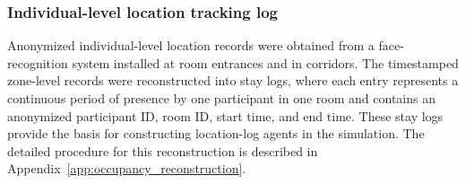 %     



\subsubsection{Individual-level location tracking log}
Anonymized individual-level location records were obtained from a face-recognition system installed at room entrances and in corridors.
The timestamped zone-level records were reconstructed into stay logs, where each entry represents a continuous period of presence by one participant in one room and contains an anonymized participant ID, room ID, start time, and end time.
These stay logs provide the basis for constructing location-log agents in the simulation.
The detailed procedure for this reconstruction is described in Appendix~\ref{app:occupancy_reconstruction}.

